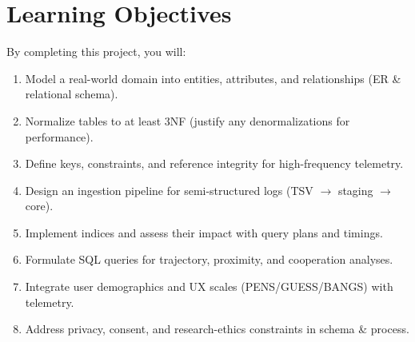\documentclass[11pt]{article}
\begin{document}
\section{Learning Objectives}
By completing this project, you will:
\begin{enumerate}[leftmargin=*]
  \item Model a real-world domain into entities, attributes, and relationships (ER \& relational schema).
  \item Normalize tables to at least 3NF (justify any denormalizations for performance).
  \item Define keys, constraints, and reference integrity for high-frequency telemetry.
  \item Design an ingestion pipeline for semi-structured logs (TSV $\rightarrow$ staging $\rightarrow$ core).
  \item Implement indices and assess their impact with query plans and timings.
  \item Formulate SQL queries for trajectory, proximity, and cooperation analyses.
  \item Integrate user demographics and UX scales (PENS/GUESS/BANGS) with telemetry.
  \item Address privacy, consent, and research-ethics constraints in schema \& process.
\end{enumerate}

\end{document}
